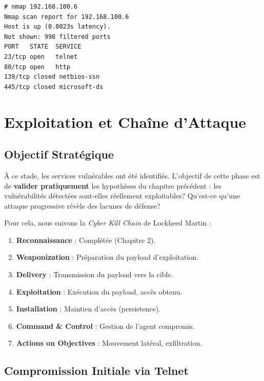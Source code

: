 \documentclass[12pt,a4paper,openany]{report}
\begin{document}
\begin{lstlisting}[style=logstyle,caption={Nmap scan results: 1000 ports, 2 open}]
# nmap 192.168.100.6
Nmap scan report for 192.168.100.6
Host is up (0.0023s latency).
Not shown: 998 filtered ports
PORT   STATE  SERVICE
23/tcp open   telnet
80/tcp open   http
139/tcp closed netbios-ssn
445/tcp closed microsoft-ds
\end{lstlisting}

\chapter{Exploitation et Chaîne d'Attaque}

\section{Objectif Stratégique}

À ce stade, les services vulnérables ont été identifiés. L'objectif de cette phase est de \textbf{valider pratiquement} les hypothèses du chapitre précédent : les vulnérabilités détectées sont-elles réellement exploitables? Qu'est-ce qu'une attaque progressive révèle des lacunes de défense?

Pour cela, nous suivons la \textit{Cyber Kill Chain} de Lockheed Martin :

\begin{enumerate}[leftmargin=*]
	\item \textbf{Reconnaissance} : \textcolor{success}{\checkmark} Complétée (Chapitre 2).
	\item \textbf{Weaponization} : Préparation du payload d'exploitation.
	\item \textbf{Delivery} : Transmission du payload vers la cible.
	\item \textbf{Exploitation} : Exécution du payload, accès obtenu.
	\item \textbf{Installation} : Maintien d'accès (persistence).
	\item \textbf{Command \& Control} : Gestion de l'agent compromis.
	\item \textbf{Actions on Objectives} : Mouvement latéral, exfiltration.
\end{enumerate}

\section{Compromission Initiale via Telnet}
\end{document}
